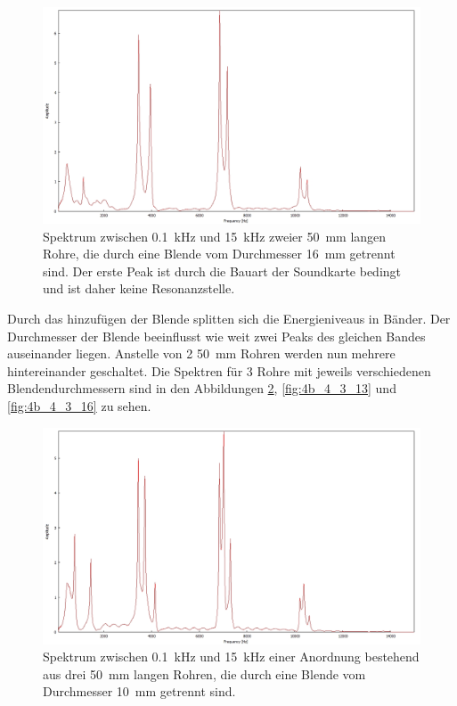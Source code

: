 \begin{figure}
\centering
\includegraphics[width=\textwidth]{content/messungen/Chapter4b/4b_3_10.jpg}
\caption{Spektrum zwischen 0.1~kHz und 15~kHz zweier 50~mm langen Rohre, die durch eine Blende vom Durchmesser 16~mm getrennt sind. Der erste Peak ist durch die Bauart der Soundkarte bedingt und ist daher keine Resonanzstelle.}
\label{fig:4b_3_16}
\end{figure}
Durch das hinzufügen der Blende splitten sich die Energieniveaus in Bänder.
Der Durchmesser der Blende beeinflusst wie weit zwei Peaks des gleichen Bandes auseinander liegen.
Anstelle von 2 50~mm Rohren werden nun mehrere hintereinander geschaltet.
Die Spektren für 3 Rohre mit jeweils verschiedenen Blendendurchmessern sind in den Abbildungen \ref{fig:4b_4_3_10}, \ref{fig:4b_4_3_13} und \ref{fig:4b_4_3_16} zu sehen.
\begin{figure}
\centering
\includegraphics[width=\textwidth]{content/messungen/Chapter4b/4b_4_3_10.jpg}
\caption{Spektrum zwischen 0.1~kHz und 15~kHz einer Anordnung bestehend aus drei 50~mm langen Rohren, die durch eine Blende vom Durchmesser 10~mm getrennt sind.}
\label{fig:4b_4_3_10}
\end{figure}
